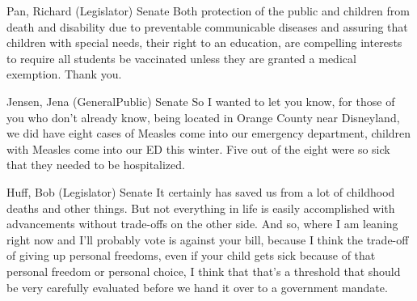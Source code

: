 \begin{result}{8.830523154233383}{Pan, Richard (Legislator) Senate}
Both protection of the public and children from death and disability due to preventable communicable diseases and assuring that children with special needs, their right to an education, are compelling interests to require all students be vaccinated unless they are granted a medical exemption. Thank you.
\end{result}

\begin{result}{8.67213374776659}{Jensen, Jena (GeneralPublic) Senate}
So I wanted to let you know, for those of you who don't already know, being located in Orange County near Disneyland, we did have eight cases of Measles come into our emergency department, children with Measles come into our ED this winter. Five out of the eight were so sick that they needed to be hospitalized.
\end{result}

\begin{result}{8.587621734089648}{Huff, Bob (Legislator) Senate}
It certainly has saved us from a lot of childhood deaths and other things. But not everything in life is easily accomplished with advancements without trade-offs on the other side. And so, where I am leaning right now and I'll probably vote is against your bill, because I think the trade-off of giving up personal freedoms, even if your child gets sick because of that personal freedom or personal choice, I think that that's a threshold that should be very carefully evaluated before we hand it over to a government mandate.
\end{result}

